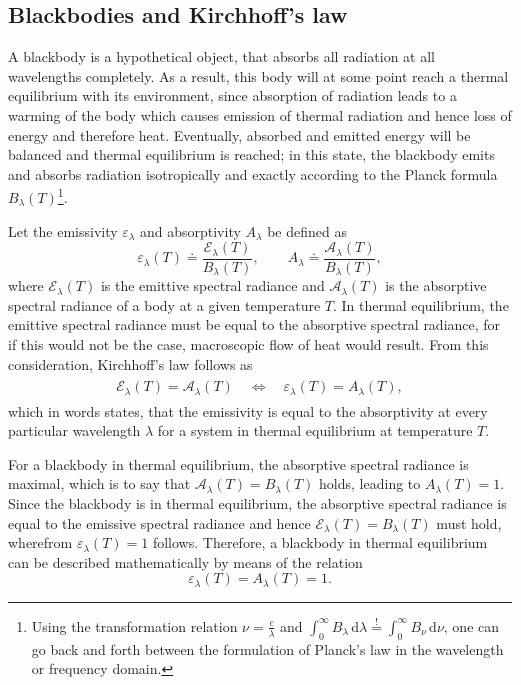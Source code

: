 \documentclass[a4paper,12pt]{report}
\begin{document}
\subsection{Blackbodies and Kirchhoff's law}
A blackbody is a hypothetical object, that absorbs all radiation at all wavelengths completely. As a result, this body will at some point reach a thermal equilibrium with its environment, since absorption of radiation leads to a warming of the body which causes emission of thermal radiation and hence loss of energy and therefore heat. Eventually, absorbed and emitted energy will be balanced and thermal equilibrium is reached; in this state, the blackbody emits and absorbs radiation isotropically and exactly according to the Planck formula $B_\lambda(T)$\footnote{Using the transformation relation $\nu = \frac{c}{\lambda}$ and $\int_{0}^{\infty} B_\lambda \,\mathrm{d}\lambda \overset{!}{=} \int_{0}^{\infty} B_\nu\,\mathrm{d}\nu$, one can go back and forth between the formulation of Planck's law in the wavelength or frequency domain.}.

Let the emissivity $\varepsilon_\lambda$ and absorptivity $A_\lambda$ be defined as \begin{equation}
\varepsilon_\lambda(T) \doteq \frac{\mathcal{E}_\lambda(T)}{B_\lambda(T)}, \qquad A_\lambda \doteq \frac{\mathcal{A}_\lambda(T)}{B_\lambda(T)},
\end{equation} where $\mathcal{E}_\lambda(T)$ is the emittive spectral radiance and $\mathcal{A}_\lambda(T)$ is the absorptive spectral radiance of a body at a given temperature $T$. In thermal equilibrium, the emittive spectral radiance must be equal to the absorptive spectral radiance, for if this would not be the case, macroscopic flow of heat would result. From this consideration, Kirchhoff's law follows as
\begin{align}\begin{aligned}
\mathcal{E}_\lambda(T) = \mathcal{A}_\lambda(T) \quad \Leftrightarrow \quad \varepsilon_\lambda(T) = A_\lambda(T),
\end{aligned}\end{align} which in words states, that the emissivity is equal to the absorptivity at every particular wavelength $\lambda$ for a system in thermal equilibrium at temperature $T$.

For a blackbody in thermal equilibrium, the absorptive spectral radiance is maximal, which is to say that $\mathcal{A}_\lambda(T) = B_\lambda(T)$ holds, leading to $A_\lambda(T) = 1$. Since the blackbody is in thermal equilibrium, the absorptive spectral radiance is equal to the emissive spectral radiance and hence $\mathcal{E}_\lambda(T) = B_\lambda(T)$ must hold, wherefrom  $\varepsilon_\lambda(T) = 1$ follows. Therefore, a blackbody in thermal equilibrium can be described mathematically by means of the relation \begin{equation}
\varepsilon_\lambda(T) = A_\lambda(T) = 1.
\end{equation}
\end{document}

